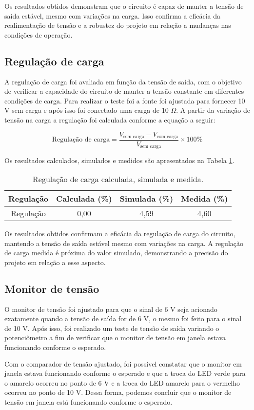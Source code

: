 Os resultados obtidos demonstram que o circuito é capaz de manter a tensão de saída estável, mesmo com variações na carga. Isso confirma a eficácia da realimentação de tensão e a robustez do projeto em relação a mudanças nas condições de operação.

\subsection{Regulação de carga}

A regulação de carga foi avaliada em função da tensão de saída, com o objetivo de verificar a capacidade do circuito de manter a tensão constante em diferentes condições de carga. Para realizar o teste foi a fonte foi ajustada para fornecer 10 V sem carga e após isso foi conectado uma carga de 10 \(\Omega\). A partir da variação de tensão na carga a regulação foi calculada conforme a equação a seguir:

\begin{equation}
    \text{Regulação de carga} = \frac{V_{\text{sem carga}} - V_{\text{com carga}}}{V_{\text{sem carga}}} \times 100\%
\end{equation}

Os resultados calculados, simulados e medidos são apresentados na Tabela \ref{tab:regulacao}.

\begin{table}[H]
    \centering
    \caption{Regulação de carga calculada, simulada e medida.}
    \label{tab:regulacao}
    \begin{tabular}{|c|c|c|c|}
    \hline
    \textbf{Regulação} & \textbf{Calculada (\%)} & \textbf{Simulada (\%)} & \textbf{Medida (\%)} \\ \hline
    Regulação         & 0,00                   & 4,59                 & 4,60               \\ \hline
    \end{tabular}
\end{table}

Os resultados obtidos confirmam a eficácia da regulação de carga do circuito, mantendo a tensão de saída estável mesmo com variações na carga. A regulação de carga medida é próxima do valor simulado, demonstrando a precisão do projeto em relação a esse aspecto.

\subsection{Monitor de tensão}

O monitor de tensão foi ajustado para que o sinal de 6 V seja acionado exatamente quando a tensão de saída for de 6 V, o mesmo foi feito para o sinal de 10 V. Após isso, foi realizado um teste de tensão de saída variando o potenciômetro a fim de verificar que o monitor de tensão em janela estava funcionando conforme o esperado.

Com o comparador de tensão ajustado, foi possível constatar que o monitor em janela estava funcionando conforme o esperado e que a troca do LED verde para o amarelo ocorreu no ponto de 6 V e a troca do LED amarelo para o vermelho ocorreu no ponto de 10 V. Dessa forma, podemos concluir que o monitor de tensão em janela está funcionando conforme o esperado.


